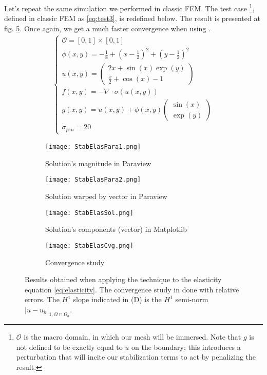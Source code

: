 Let's repeat the same simulation we performed in classic FEM. The test case \footnote{$\mathcal{O}$ is the macro domain, in which our mesh will be immersed. Note that $g$ is not defined to be exactly equal to $u$ on the boundary; this introduces a perturbation that will incite our stabilization terms to act by penalizing the result.}, defined in classic FEM as \eqref{eq:test3}, is redefined below. The result is presented at fig. \ref{fig:StabElas}. Once again, we get a much faster convergence when using \phifem.
\begin{align}
    \begin{cases}
    \mathcal{O} = [0,1]\times[0,1] \\
    \phi(x,y) = -\frac{1}{8} + \left( x-\frac{1}{2} \right)^2 + \left( y-\frac{1}{2} \right)^2 \\
    u(x,y)= \begin{pmatrix}
        2x + \sin(x)\exp(y) \\ \frac{x}{2} + \cos(x) - 1
    \end{pmatrix}  \\
    f(x,y) = -\nabla \cdot \sigma(u(x,y)) \\
    g(x,y) = u(x,y) + \phi(x,y) \begin{pmatrix}
       \sin(x) \\ \exp(y)
    \end{pmatrix} \\
    \sigma_{pen} = 20
    \end{cases}
    \label{eq:test4}
\end{align}

\begin{figure}[H]
    \centering
    \begin{subfigure}[b]{0.40\textwidth}
        \texttt{[image: StabElasPara1.png]}
        \caption{Solution's magnitude in Paraview}
        \label{fig:Para3}
    \end{subfigure}
    \begin{subfigure}[b]{0.50\textwidth}
        \texttt{[image: StabElasPara2.png]}
        \caption{Solution warped by vector in Paraview}
        \label{fig:Para3}
    \end{subfigure}
    \begin{subfigure}[b]{0.45\textwidth}
        \texttt{[image: StabElasSol.png]}
        \caption{Solution's components (vector) in Matplotlib}
        \label{fig:StabElasSol}
    \end{subfigure}
    \begin{subfigure}[b]{0.45\textwidth}
        \texttt{[image: StabElasCvg.png]}
        \caption{Convergence study}
        \label{fig:StabElasCvg}
    \end{subfigure}
       \caption{Results obtained when applying the \phifem  technique to the elasticity equation \eqref{eq:elasticity}. The convergence study in done with relative errors. The $H^1$ slope indicated in (D) is the $H^1$ semi-norm $ | u - u_h|_{1, \Omega\cap\Omega_h}$.}
       \label{fig:StabElas}
\end{figure}


